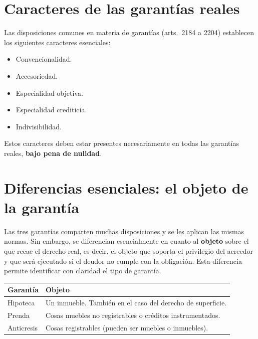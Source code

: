 \documentclass[12pt,oneside]{book}
\begin{document}
\section{Caracteres de las garantías reales}

Las disposiciones comunes en materia de garantías (arts.\ 2184 a 2204) establecen los siguientes caracteres esenciales:

\begin{itemize}
    \item Convencionalidad.
    \item Accesoriedad.
    \item Especialidad objetiva.
    \item Especialidad crediticia.
    \item Indivisibilidad.
\end{itemize}

\begin{important}
Estos caracteres deben estar presentes necesariamente en todas las garantías reales, \textbf{bajo pena de nulidad}.
\end{important}

\section{Diferencias esenciales: el objeto de la garantía}

Las tres garantías comparten muchas disposiciones y se les aplican las mismas normas. Sin embargo, se diferencian esencialmente en cuanto al \textbf{objeto} sobre el que recae el derecho real, es decir, el objeto que soporta el privilegio del acreedor y que será ejecutado si el deudor no cumple con la obligación. Esta diferencia permite identificar con claridad el tipo de garantía.

\begin{table}[H]
\centering
\begin{tabularx}{\textwidth}{
    >{\raggedright\arraybackslash}p{}
    >{\raggedright\arraybackslash}X
}
\toprule
\textbf{Garantía} & \textbf{Objeto} \\
\midrule
Hipoteca & Un inmueble. También en el caso del derecho de superficie. \\
Prenda & Cosas muebles no registrables o créditos instrumentados. \\
Anticresis & Cosas registrables (pueden ser muebles o inmuebles). \\
\bottomrule
\end{tabularx}
\end{table}
\end{document}
